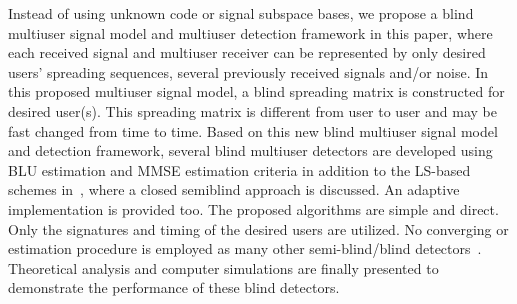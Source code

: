\documentclass[a4paper,10pt,fleqn, twocolumn]{IEEETran}
\begin{document}
Instead of using unknown code or signal subspace bases, we propose
a blind multiuser signal model and multiuser detection framework
in this paper, where each received signal and multiuser receiver
can be represented by only desired users' spreading sequences,
several previously received signals and/or noise. In this proposed
multiuser signal model, a blind spreading matrix is constructed
for desired user(s). This spreading matrix is different from user
to user and may be fast changed from time to time. Based on this
new blind multiuser signal model and detection framework, several
blind multiuser detectors are developed using BLU estimation and
MMSE estimation criteria in addition to the LS-based schemes
in~\cite{Wang03d,Wang03e}, where a closed semiblind approach is
discussed. An adaptive implementation is provided too. The
proposed algorithms are simple and direct. Only the signatures and
timing of the desired users are utilized. No converging or
estimation procedure is employed as many other semi-blind/blind
detectors~\cite{Torl97,Wang98}. Theoretical analysis and computer
simulations are finally presented to demonstrate the performance
of these blind detectors.
\end{document}
